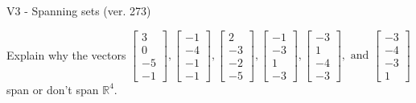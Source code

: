 \begin{exercise}
  \begin{exerciseTitle}V3 - Spanning sets (ver. 273)\end{exerciseTitle}
  \begin{exerciseStatement}
    Explain why the vectors \(\left[\begin{array}{r}
3 \\
0 \\
-5 \\
-1
\end{array}\right] , \left[\begin{array}{r}
-1 \\
-4 \\
-1 \\
-1
\end{array}\right] , \left[\begin{array}{r}
2 \\
-3 \\
-2 \\
-5
\end{array}\right] , \left[\begin{array}{r}
-1 \\
-3 \\
1 \\
-3
\end{array}\right] , \left[\begin{array}{r}
-3 \\
1 \\
-4 \\
-3
\end{array}\right] , \text{ and } \left[\begin{array}{r}
-3 \\
-4 \\
-3 \\
1
\end{array}\right]\) span or don't span \(\mathbb{R}^4\). 
	



\end{exerciseStatement}
\end{exercise}
